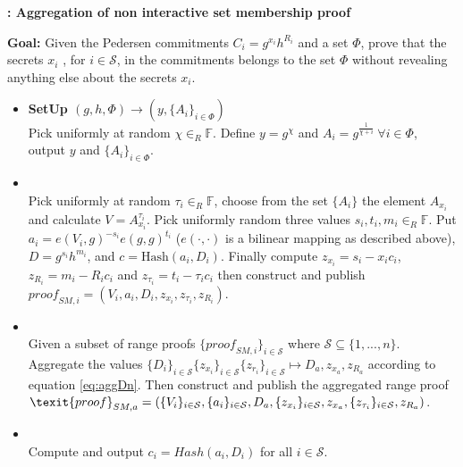 \begin{algorithm}[]
\caption{\textbf{: Aggregation of non interactive set membership proof}}
\textbf{Goal:} Given the Pedersen commitments $C_i=g^{x_i} h^{R_i}$ and a set $\Phi$, prove that the secrets $x_i$ , for $i\in\mathcal{S}$, in the commitments belongs to the set $\Phi$ without revealing anything else about the secrets $x_i$.
\vspace{2pt} \hline \vspace{2pt}
\begin{itemize}
  \item\textbf{SetUp $(g,h,\Phi)\xrightarrow[]{}(y,\{A_{i}\}_{i\in\Phi})$}\\
Pick uniformly at random $\chi\in_R\mathds{F}$. Define $y=g^\chi$ and $A_i=g^{\frac{1}{\chi+i}} \:\forall i\in\Phi$, output $y$ and $\{A_i\}_{i\in\Phi}$.

\item{}\\
Pick uniformly at random $\tau_i\in_R\mathds{F}$, choose from the set $\{A_i\}$ the element $A_{x_i}$ and calculate $V=A_{x_i}^{\tau_i}$. Pick uniformly random three values $s_i,t_i,m_i\in_R\mathds{F}$. Put $a_i=e(V_i,g)^{-s_i}e(g,g)^{t_i}$ ($e(\cdot,\cdot)$ is a bilinear mapping as described above), $D=g^{s_i}h^{m_i}$, and $c=\text{Hash}(a_i,D_i)$. Finally compute $z_{x_i} = s_i-x_i c_i$, $z_{R_i} = m_i-R_ic_i$ and $z_{\tau_i}= t_i-\tau_i c_i$ then construct and publish $\textit{proof}_{SM,i} = (V_i,a_i,D_i,z_{x_i},z_{\tau_i},z_{R_i})$.

\item {} \\
Given a subset of range proofs  $\{ \textit{proof}_{SM,i}\}_{i\in\mathcal{S}}$ where $\mathcal{S}\subseteq \{1,...,n\}$. Aggregate the values $\{D_i \}_{i\in\mathcal{S} } \{ z_{x_i}\}_{i\in\mathcal{S} } \{ z_{r_i}\}_{i\in\mathcal{S} } \mapsto D_a,z_{x_a},z_{R_a}$ according to equation \eqref{eq:aggDn}. Then construct and publish the aggregated range proof $\texit{proof}_{SM,a} = (\{V_i\}_{i\in\mathcal{S} },\{a_i\}_{i\in\mathcal{S} },D_a,\{z_{x_i}\}_{i\in\mathcal{S} }, z_{x_a}, \{z_{\tau_i}\}_{i\in\mathcal{S} },z_{R_a})$.

\item {}\\
Compute and output $c_i = Hash(a_i,D_i)$ for all $i\in\mathcal{S}$.


\end{itemize}
\end{algorithm}
